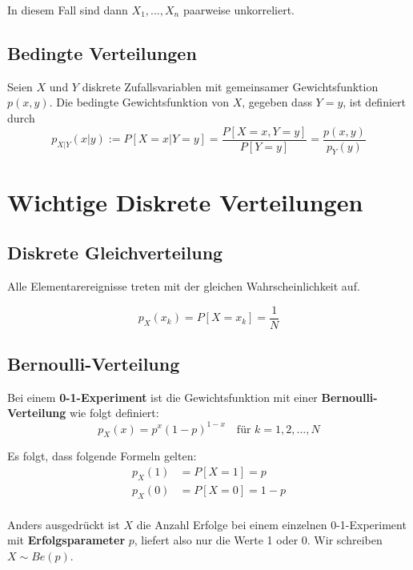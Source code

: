 \documentclass[11pt]{article}
\begin{document}
In diesem Fall sind dann $X_1,...,X_n$ paarweise unkorreliert.

\subsection{Bedingte Verteilungen}

Seien $X$ und $Y$ diskrete Zufallsvariablen mit gemeinsamer Gewichtsfunktion $p(x, y)$. Die bedingte Gewichtsfunktion von $X$, gegeben dass $Y = y$, ist definiert durch
\begin{equation*}
	p_{X|Y}(x|y) := P[X=x|Y=y] = \frac{P[X=x,Y=y]}{P[Y=y]} = \frac{p(x,y)}{p_Y(y)}
\end{equation*}

\section{Wichtige Diskrete Verteilungen}

\subsection{Diskrete Gleichverteilung}

Alle Elementarereignisse treten mit der gleichen Wahrscheinlichkeit auf.

\begin{equation*}
	p_X(x_k) = P[X = x_k] = \frac{1}{N}
\end{equation*}

\subsection{Bernoulli-Verteilung}

Bei einem \textbf{0-1-Experiment} ist die Gewichtsfunktion mit einer \textbf{Bernoulli-Verteilung} wie folgt definiert:
\begin{equation*}
	p_X(x) = p^x(1-p)^{1-x} \quad\text{f{\"u}r } k = 1, 2, ..., N
\end{equation*}

Es folgt, dass folgende Formeln gelten:
\begin{equation*}
\begin{split}
	p_X(1) & = P[X = 1] = p \\
	p_X(0) & = P[X = 0] = 1-p \\
\end{split}
\end{equation*}

Anders ausgedr{\"u}ckt ist $X$ die Anzahl Erfolge bei einem einzelnen 0-1-Experiment mit \textbf{Erfolgsparameter} $p$, liefert also nur die Werte 1 oder 0. Wir schreiben $X \sim Be(p)$.
\end{document}
